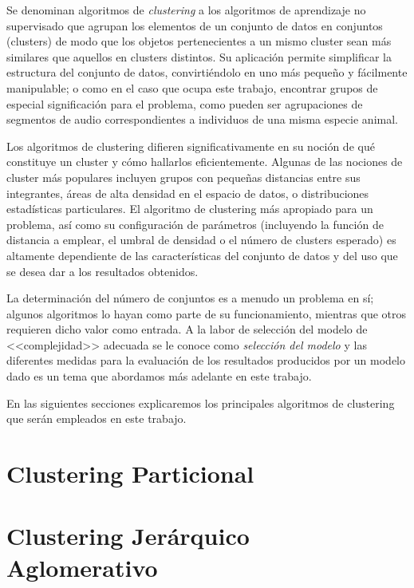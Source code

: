 Se denominan algoritmos de \textit{clustering} a los algoritmos de aprendizaje no supervisado que agrupan los elementos de un conjunto de datos en conjuntos (clusters) de modo que los objetos pertenecientes a un mismo cluster sean más similares que aquellos en clusters distintos.
Su aplicación permite simplificar la estructura del conjunto de datos, convirtiéndolo en uno más pequeño y fácilmente manipulable;
o como en el caso que ocupa este trabajo, encontrar grupos de especial significación para el problema, como pueden ser agrupaciones de segmentos de audio correspondientes a individuos de una misma especie animal.

Los algoritmos de clustering difieren significativamente en su noción de qué constituye un cluster y cómo hallarlos eficientemente.
Algunas de las nociones de cluster más populares incluyen grupos con pequeñas distancias entre sus integrantes, áreas de alta densidad en el espacio de datos, o distribuciones estadísticas particulares.
El algoritmo de clustering más apropiado para un problema, así como su configuración de parámetros (incluyendo la función de distancia a emplear, el umbral de densidad o el número de clusters esperado) es altamente dependiente de las características del conjunto de datos y del uso que se desea dar a los resultados obtenidos.

La determinación del número de conjuntos es a menudo un problema en sí;
algunos algoritmos lo hayan como parte de su funcionamiento, mientras que otros requieren dicho valor como entrada.
A la labor de selección del modelo de <<complejidad>> adecuada se le conoce como \textit{selección del modelo} y las diferentes medidas para la evaluación de los resultados producidos por un modelo dado es un tema que abordamos más adelante en este trabajo.

En las siguientes secciones explicaremos los principales algoritmos de clustering que serán empleados en este trabajo.

\section{Clustering Particional}\label{sec:clusteringParticional}


\section{Clustering Jerárquico Aglomerativo}\label{sec:clusteringJerárquicoAglomerativo}


